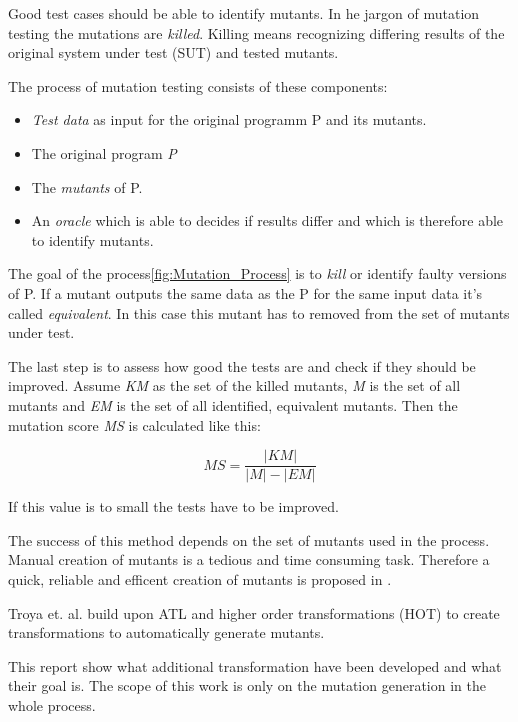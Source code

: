 \documentclass{llncs}
\begin{document}
Good test cases should be able to identify mutants. In he jargon of mutation testing the mutations are \emph{killed}. Killing means recognizing differing results of the original system under test (SUT) and tested mutants.\cite{MatMottu2006}

The process of mutation testing consists of these components:
\begin{itemize}
	\item \textit{Test data} as input for the original programm P and its mutants.
	\item The original program \textit{P}
	\item The \textit{mutants} of P.
	\item An \textit{oracle} which is able to decides if results differ and which is therefore able to identify mutants.
\end{itemize}

The goal of the process\ref{fig:Mutation_Process} is to \textit{kill} or identify faulty versions of P. If a mutant outputs the same data as the P for the same input data it's called \textit{equivalent}. In this case this mutant has to removed from the set of mutants under test.

The last step is to assess how good the tests are and check if they should be improved. Assume \textit{KM} as the set of the killed mutants, \textit{M} is the set of all mutants and \textit{EM} is the set of all identified, equivalent mutants. Then the mutation score \textit{MS} is calculated like this:\cite{mutationssurvey:yue}

\begin{equation}
	MS = \frac{\left|KM\right|}{\left|M\right| - \left|EM\right|}
	\label{eq:ms}
\end{equation}

If this value is to small the tests have to be improved. 

The success of this method depends on the set of mutants used in the process. Manual creation of mutants is a tedious and time consuming task. Therefore a quick, reliable and efficent creation of mutants is proposed in \cite{troya:2015}.

Troya et. al. build upon ATL and higher order transformations (HOT) to create transformations to automatically generate mutants. 

This report show what additional transformation have been developed and what their goal is. The scope of this work is only on the mutation generation in the whole process.
\end{document}
